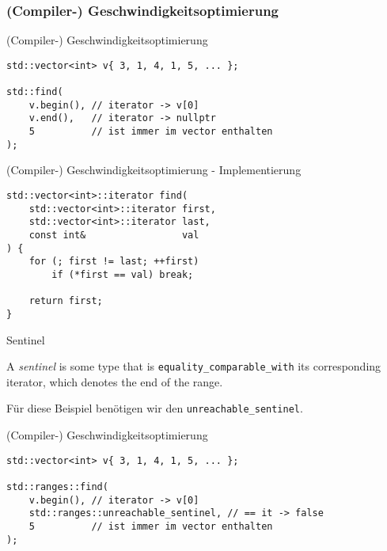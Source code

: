 \subsubsection{(Compiler-) Geschwindigkeitsoptimierung}

\begin{frame}[fragile]{(Compiler-) Geschwindigkeitsoptimierung}
    \begin{verbatim}
std::vector<int> v{ 3, 1, 4, 1, 5, ... };

std::find(
    v.begin(), // iterator -> v[0]
    v.end(),   // iterator -> nullptr
    5          // ist immer im vector enthalten
);
    \end{verbatim}
\end{frame}

\begin{frame}[fragile]{(Compiler-) Geschwindigkeitsoptimierung - Implementierung}
    \begin{verbatim}
std::vector<int>::iterator find(
    std::vector<int>::iterator first,
    std::vector<int>::iterator last,
    const int&                 val
) {
    for (; first != last; ++first)
        if (*first == val) break;
    
    return first;
}
    \end{verbatim}
\end{frame}

\begin{frame}{Sentinel}
    \begin{center}
        A \emph{sentinel} is some type that is \texttt{equality\_comparable\_with} its corresponding iterator, which denotes the end of the range.

        \vspace{2.5em}

        Für diese Beispiel benötigen wir den \texttt{unreachable\_sentinel}.
    \end{center}
\end{frame}

\begin{frame}[fragile]{(Compiler-) Geschwindigkeitsoptimierung}
    \begin{verbatim}
std::vector<int> v{ 3, 1, 4, 1, 5, ... };

std::ranges::find(
    v.begin(), // iterator -> v[0]
    std::ranges::unreachable_sentinel, // == it -> false
    5          // ist immer im vector enthalten
);
    \end{verbatim}
\end{frame}

